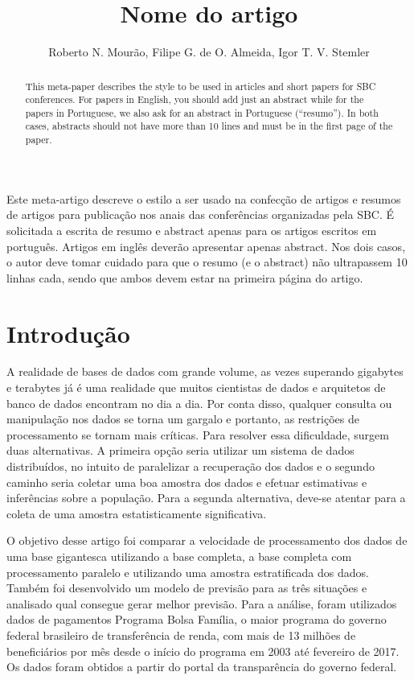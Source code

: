 \documentclass[12pt]{article}
\title{Nome do artigo}
\author{Roberto N. Mourão\inst{1}, Filipe G. de O. Almeida\inst{1}, Igor T. V. Stemler\inst{1} }
\begin{document}
 

\maketitle

\begin{abstract}
  This meta-paper describes the style to be used in articles and short papers
  for SBC conferences. For papers in English, you should add just an abstract
  while for the papers in Portuguese, we also ask for an abstract in
  Portuguese (``resumo''). In both cases, abstracts should not have more than
  10 lines and must be in the first page of the paper.
\end{abstract}
     
\begin{resumo} 
  Este meta-artigo descreve o estilo a ser usado na confecção de artigos e
  resumos de artigos para publicação nos anais das conferências organizadas
  pela SBC. É solicitada a escrita de resumo e abstract apenas para os artigos
  escritos em português. Artigos em inglês deverão apresentar apenas abstract.
  Nos dois casos, o autor deve tomar cuidado para que o resumo (e o abstract)
  não ultrapassem 10 linhas cada, sendo que ambos devem estar na primeira
  página do artigo.
\end{resumo}


\section{Introdução}

	A realidade de bases de dados com grande volume, as vezes superando gigabytes e terabytes já é uma realidade que muitos cientistas de dados e arquitetos de banco de dados encontram no dia a dia. Por conta disso, qualquer consulta ou manipulação nos dados se torna um gargalo e portanto, as restrições de processamento se tornam mais críticas. Para resolver essa dificuldade, surgem duas alternativas. A primeira opção seria utilizar um sistema de dados distribuídos, no intuito de paralelizar a recuperação dos dados e o segundo caminho seria coletar uma boa amostra dos dados e efetuar estimativas e inferências sobre a população. Para a segunda alternativa, deve-se atentar para a coleta de uma amostra estatisticamente significativa. \newline

	O objetivo desse artigo foi comparar a velocidade de processamento dos dados de uma base gigantesca utilizando a base completa, a base completa com processamento paralelo e utilizando uma amostra estratificada dos dados. Também foi desenvolvido um modelo de previsão para as três situações e analisado qual consegue gerar melhor previsão. Para a análise, foram utilizados dados de pagamentos Programa Bolsa Família, o maior programa do governo federal brasileiro de transferência de renda, com mais de 13 milhões de beneficiários por mês desde o início do programa em 2003 até fevereiro de 2017. Os dados foram obtidos a partir do portal da transparência do governo federal.\newline
\end{document}
